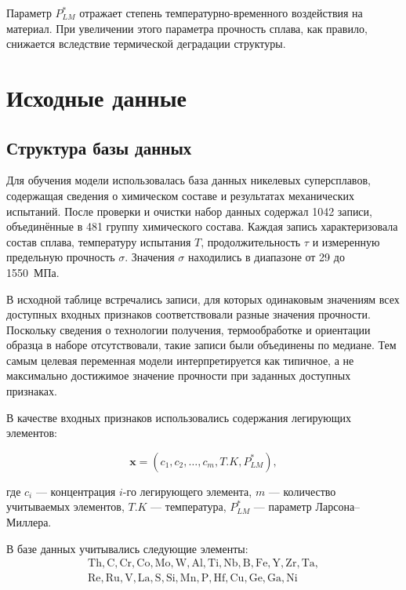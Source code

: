Параметр $P_{LM}^{*}$ отражает степень температурно-временного 
воздействия на материал. При увеличении этого параметра прочность 
сплава, как правило, снижается вследствие термической деградации 
структуры.

\section{Исходные данные}

\subsection{Структура базы данных}

Для обучения модели использовалась база данных никелевых суперсплавов, 
содержащая сведения о химическом составе и результатах механических 
испытаний. После проверки и очистки набор данных содержал 1042 записи, объединённые
в 481 группу химического состава. Каждая запись характеризовала состав
сплава, температуру испытания $T$, продолжительность $\tau$ и измеренную
предельную прочность $\sigma$. Значения $\sigma$ находились в диапазоне
от 29 до 1550~МПа.

В исходной таблице встречались записи, для которых одинаковым значениям
всех доступных входных признаков соответствовали разные значения
прочности. Поскольку сведения о технологии получения, термообработке и
ориентации образца в наборе отсутствовали, такие записи были объединены
по медиане. Тем самым целевая переменная модели интерпретируется как
типичное, а не максимально достижимое значение прочности при заданных
доступных признаках.

В качестве входных признаков использовались содержания легирующих элементов:

\begin{equation}
\mathbf{x} =
\left(
c_1, c_2, \ldots, c_m, T.K, P_{LM}^{*}
\right),
\end{equation}

где $c_i$ --- концентрация $i$-го легирующего элемента, 
$m$ --- количество учитываемых элементов, 
$T.K$ --- температура, 
$P_{LM}^{*}$ --- параметр Ларсона--Миллера.

В базе данных учитывались следующие элементы:
\begin{equation}
\begin{split}
\mathrm{Th, C, Cr, Co, Mo, W, Al, Ti, Nb, B, Fe, Y, Zr, Ta,} \\
\mathrm{Re, Ru, V, La, S, Si, Mn, P, Hf, Cu, Ge, Ga, Ni}
\end{split}
\end{equation}

